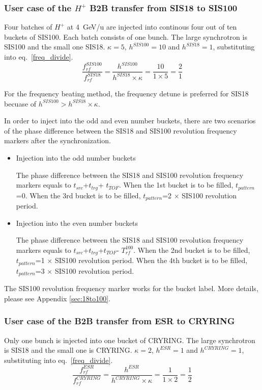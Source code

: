 \subsubsection{User case of the $H^{+}$ B2B transfer from SIS18 to SIS100}
Four batches of $H^{+}$ at \SI{4}{GeV/\atomicmassunit} are injected into continous four out of ten buckets of SIS100. Each batch consists of one bunch. The large synchrotron is SIS100 and the small one SIS18. $\kappa=5$, $h^{SIS100}=10$ and $h^{SIS18}=1$, substituting into eq.~\ref{freq_divide}.
\begin{equation}
\frac{f_{rf}^{SIS100}}{f_{rf}^{SIS18}}= \frac {h^{SIS100}}{h^{SIS18} \times \kappa}= \frac{10}{1 \times 5}=\frac{2}{1}
\end{equation}

For the frequency beating method, the frequency detune is preferred for SIS18 becuase of $h^{SIS100} > h^{SIS18} \times \kappa$.


In order to inject into the odd and even number buckets, there are two scenarios of the phase difference between the SIS18 and SIS100 revolution frequency markers after the synchronization.
\begin{itemize}
	\item Injection into the odd number buckets
		
		The phase difference between the SIS18 and SIS100 revolution frequency markers equals to $t_{src}$+$t_{trg}$+ $t_{TOF}$. When the 1st bucket is to be filled, $t_{pattern}$=0. When the 3rd bucket is to be filled, $t_{pattern}$=2 $\times$ SIS100 revolution period. 
	\item Injection into the even number buckets
	
		The phase difference between the SIS18 and SIS100 revolution frequency markers equals to $t_{src}$+$t_{trg}$+$t_{TOF}$- $T_{rf}^{100}$. When the 2nd bucket is to be filled, $t_{pattern}$=1 $\times$ SIS100 revolution period. When the 4th bucket is to be filled, $t_{pattern}$=3 $\times$ SIS100 revolution period. 

\end{itemize}

The SIS100 revolution frequency marker works for the bucket label. More details, please see Appendix \ref{sec:18to100}.

\subsubsection{User case of the B2B transfer from ESR to CRYRING}
Only one bunch is injected into one bucket of CRYRING. The large synchrotron is SIS18 and the small one is CRYRING. $\kappa=2$, $h^{ESR}=1$ and $h^{CRYRING}=1$, substituting into eq.~\ref{freq_divide}. 
\begin{equation}
\frac{f_{rf}^{ESR}}{f_{rf}^{CRYRING}}= \frac {h^{ESR}}{h^{CRYRING} \times \kappa}= \frac{1}{1 \times 2}=\frac{1}{2}
\end{equation}

